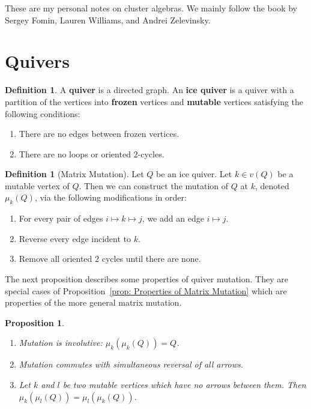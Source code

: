 \documentclass[]{pcmi}
\theoremstyle{plain}
\newtheorem{Proposition}[equation]{Proposition}
\theoremstyle{definition}
\newtheorem{Definition}[equation]{Definition}
\begin{document}
These are my personal notes on cluster algebras. We mainly follow the book by Sergey Fomin, Lauren Williams, and Andrei Zelevinsky. 

\section{Quivers}

\begin{Definition}
    A \textbf{quiver} is a directed graph. An \textbf{ice quiver} is a quiver with a partition of the vertices into \textbf{frozen} vertices and \textbf{mutable} vertices satisfying the following conditions:
    \begin{enumerate}
        \item There are no edges between frozen vertices. 
        \item There are no loops or oriented $2$-cycles. 
    \end{enumerate}
\end{Definition}

\begin{Definition}[Matrix Mutation]
    Let $Q$ be an ice quiver. Let $k \in v(Q)$ be a mutable vertex of $Q$. Then we can construct the mutation of $Q$ at $k$, denoted $\mu_k(Q)$, via the following modifications in order:
    \begin{enumerate}
        \item For every pair of edges $i \mapsto k \mapsto j$, we add an edge $i \mapsto j$. 
        \item Reverse every edge incident to $k$. 
        \item Remove all oriented $2$ cycles until there are none. 
    \end{enumerate}
\end{Definition}

The next proposition describes some properties of quiver mutation. They are special cases of Proposition~\ref{prop: Properties of Matrix Mutation} which are properties of the more general matrix mutation. 

\begin{Proposition}
    \phantom{h}
    \begin{enumerate}
        \item Mutation is involutive: $\mu_k (\mu_k(Q)) = Q$. 
        \item Mutation commutes with simultaneous reversal of all arrows. 
        \item Let $k$ and $l$ be two mutable vertices which have no arrows between them. Then $\mu_k(\mu_l(Q)) = \mu_l(\mu_k(Q))$. 
    \end{enumerate}
\end{Proposition}
\end{document}
